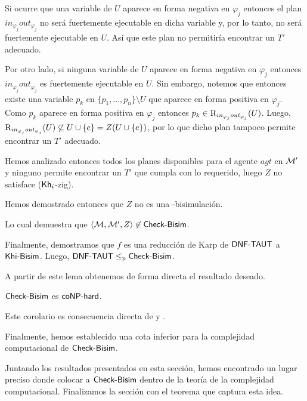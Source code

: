 \begin{demostracion}
\begin{itemize}
    Si ocurre que una variable de $U$ aparece en forma negativa en $\varphi_j$ entonces el plan 
    $in_{\varphi_j}out_{\varphi_j}$ no será fuertemente ejecutable en dicha variable y, por lo tanto, 
    no será fuertemente ejecutable en $U$. Así que este plan no permitiría encontrar un $T'$ adecuado.

    Por otro lado, si ninguna variable de $U$ aparece en forma negativa en $\varphi_j$ entonces 
    $in_{\varphi_j}out_{\varphi_j}$ es fuertemente ejecutable en $U$. Sin embargo, notemos que 
    entonces existe una variable $p_k$ en $\{p_1,...,p_n\}\setminus U$ que aparece en forma positiva en $\varphi_j$. 
    Como $p_k$ aparece en forma positiva en $\varphi_j$ entonces $p_k \in \mathrm{R}_{in_{\varphi_j}out_{\varphi_j}}(U)$. 
    Luego, $\mathrm{R}_{in_{\varphi_j}out_{\varphi_j}}(U) \not \subseteq U \cup \{e\} = Z(U \cup \{e\})$, por lo que dicho plan tampoco 
    permite encontrar un $T'$ adecuado.
    
    Hemos analizado entonces todos los planes disponibles para el agente $agt$ en $\mathcal{M}'$ y ninguno permite encontrar un 
    $T'$ que cumpla con lo requerido, luego $Z$ no satisface ($\mathsf{Kh}_i$-zig).

    Hemos demostrado entonces que $Z$ no es una \KHilogic-bisimulación.

    Lo cual demuestra que $\langle \mathcal{M},\mathcal{M}',Z \rangle \not \in \rm\textsf{Check-Bisim}$.
    \end{itemize}
    Finalmente, demostramos que $f$ es una reducción de Karp de $\rm\textsf{DNF-TAUT}$ a $\rm\textsf{Khi-Bisim}$. Luego, $\rm\textsf{DNF-TAUT} \leq_p \rm\textsf{Check-Bisim}$.
\end{demostracion}

A partir de este lema obtenemos de forma directa el resultado deseado.

\begin{corolario}\label{col:cbisim-conphard}
    $\rm\textsf{Check-Bisim}$ es $\rm\textsf{coNP-hard}$.
\end{corolario}

\begin{demostracion}
    Este corolario es consecuencia directa de  y .
\end{demostracion}

Finalmente, hemos establecido una cota inferior para la complejidad computacional de $\rm\textsf{Check-Bisim}$. 

Juntando los resultados presentados en esta sección, hemos encontrado un lugar preciso donde colocar a $\rm\textsf{Check-Bisim}$ 
dentro de la teoría de la complejidad computacional. Finalizamos la sección 
con el teorema que captura esta idea.

